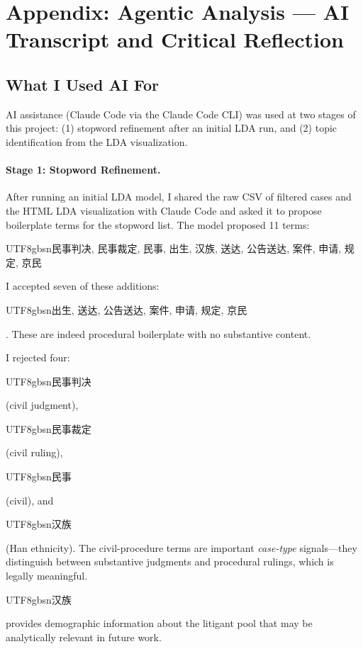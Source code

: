 \documentclass[10pt,letterpaper]{article}
\begin{document}
\newpage
\appendix
\section*{Appendix: Agentic Analysis --- AI Transcript and Critical Reflection}

\subsection*{What I Used AI For}

AI assistance (Claude Code via the Claude Code CLI) was used at two stages of this project: (1) stopword refinement after an initial LDA run, and (2) topic identification from the LDA visualization.

\paragraph{Stage 1: Stopword Refinement.}
After running an initial LDA model, I shared the raw CSV of filtered cases and the HTML LDA visualization with Claude Code and asked it to propose boilerplate terms for the stopword list. The model proposed 11 terms:

\begin{center}
\begin{CJK}{UTF8}{gbsn}民事判决, 民事裁定, 民事, 出生, 汉族, 送达, 公告送达, 案件, 申请, 规定, 京民\end{CJK}
\end{center}

I accepted seven of these additions: \begin{CJK}{UTF8}{gbsn}出生, 送达, 公告送达, 案件, 申请, 规定, 京民\end{CJK}. These are indeed procedural boilerplate with no substantive content.

I rejected four: \begin{CJK}{UTF8}{gbsn}民事判决\end{CJK} (civil judgment), \begin{CJK}{UTF8}{gbsn}民事裁定\end{CJK} (civil ruling), \begin{CJK}{UTF8}{gbsn}民事\end{CJK} (civil), and \begin{CJK}{UTF8}{gbsn}汉族\end{CJK} (Han ethnicity). The civil-procedure terms are important \textit{case-type} signals---they distinguish between substantive judgments and procedural rulings, which is legally meaningful. \begin{CJK}{UTF8}{gbsn}汉族\end{CJK} provides demographic information about the litigant pool that may be analytically relevant in future work.
\end{document}
